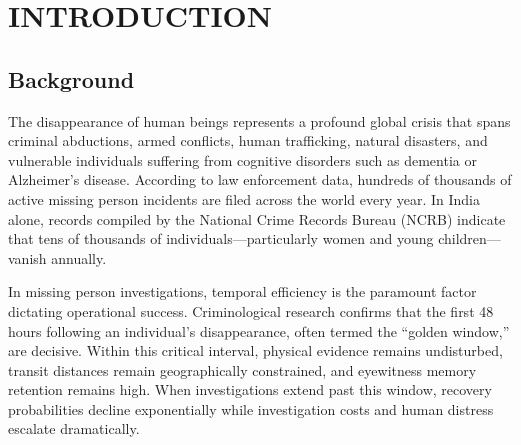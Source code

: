 \documentclass[12pt,a4paper]{report}
\begin{document}
\newpage
\listoftables

\newpage
{}
\setcounter{page}{1}

\chapter{INTRODUCTION}

\section{Background}
The disappearance of human beings represents a profound global crisis that spans criminal abductions, armed conflicts, human trafficking, natural disasters, and vulnerable individuals suffering from cognitive disorders such as dementia or Alzheimer's disease. According to law enforcement data, hundreds of thousands of active missing person incidents are filed across the world every year. In India alone, records compiled by the National Crime Records Bureau (NCRB) indicate that tens of thousands of individuals—particularly women and young children—vanish annually. 

In missing person investigations, temporal efficiency is the paramount factor dictating operational success. Criminological research confirms that the first 48 hours following an individual's disappearance, often termed the ``golden window,'' are decisive. Within this critical interval, physical evidence remains undisturbed, transit distances remain geographically constrained, and eyewitness memory retention remains high. When investigations extend past this window, recovery probabilities decline exponentially while investigation costs and human distress escalate dramatically.
\end{document}
